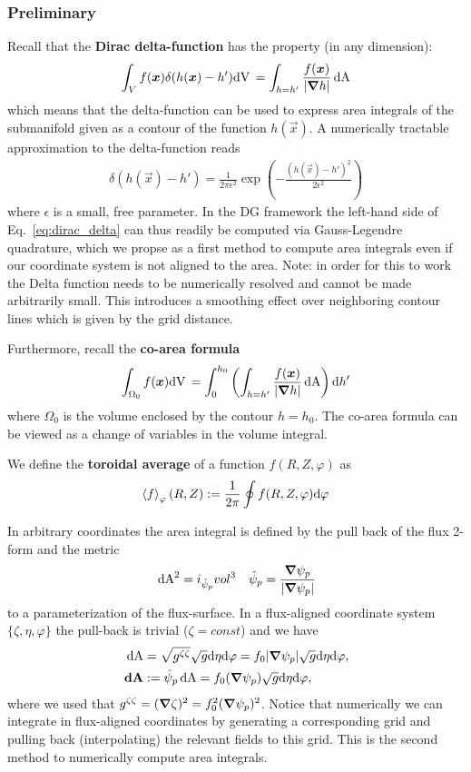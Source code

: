 \subsubsection{Preliminary}
Recall that the {\bf Dirac delta-function} has the property (in any dimension):
\begin{align} \label{eq:dirac_delta}
\int_V f({\boldsymbol{x}}) \delta(h({\boldsymbol{x}}) - h') \mathrm{dV}\, = \int_{h=h'} \frac{f({\boldsymbol{x}})}{|{\boldsymbol{\nabla}} h|} \,\mathrm{dA}
\end{align}
which means that the delta-function can be used to express area integrals of the
submanifold given as a contour of the function $h(\vec x)$.
A numerically tractable approximation to the delta-function reads
\begin{align}\label{eq:delta}
\delta(h(\vec x)-h') = \frac{1}{2\pi \epsilon^2}
\exp\left( - \frac{\left(h(\vec x)-h'\right)^2}{2\epsilon^2}\right)
\end{align}
where $\epsilon$ is a small, free parameter.
In the DG framework the left-hand side
of Eq.~\eqref{eq:dirac_delta} can thus readily be computed
via Gauss-Legendre quadrature, which we propse as a first method to compute area
integrals even if our coordinate system is not aligned to the area.
Note: in order for this to work the Delta function needs to be numerically
resolved and cannot be made arbitrarily small.
This introduces a smoothing effect
over neighboring contour lines which is given by the grid distance.

Furthermore, recall the {\bf co-area formula}
\begin{align} \label{eq:coarea}
\int_{\Omega_0} f({\boldsymbol{x}}) \mathrm{dV}\, =
\int_0^{h_0} \left( \int_{h=h'} \frac{f({\boldsymbol{x}})}{|{\boldsymbol{\nabla}} h|}  \,\mathrm{dA}  \right) \mathrm{d} h'
\end{align}
where $\Omega_0$ is the volume enclosed by the contour $h=h_0$.
The co-area formula can be viewed as a change of variables in the
volume integral.

We define the {\bf toroidal average} of a function $f(R,Z,\varphi)$ as
\begin{align} \label{eq:phi_average}
\left \langle  f \right\rangle_\varphi(R,Z) := \frac{1}{2\pi}\oint f(R,Z,\varphi)\mathrm{d} \varphi
\end{align}

In arbitrary coordinates the area integral is defined by the pull back
of the flux 2-form and the metric
\begin{align}
\label{}
\,\mathrm{dA}^2 = i_{\hat \psi_p} vol^3 \quad \hat \psi_p = \frac{{\boldsymbol{\nabla}} \psi_p}{|{\boldsymbol{\nabla}} \psi_p|}
\end{align}
to a parameterization of the flux-surface.
In a flux-aligned coordinate system $\{\zeta, \eta, \varphi\}$ the pull-back is trivial ($\zeta=const$) and we have
\begin{align}
\,\mathrm{dA} &= \sqrt{g^{\zeta\zeta}} \sqrt{g} \mathrm{d}\eta\mathrm{d}\varphi = f_0|{\boldsymbol{\nabla}}\psi_p|\sqrt{g}\mathrm{d}\eta\mathrm{d}\varphi,
\\
{\boldsymbol{\,\mathrm{dA}}} &:= \hat\psi_p \,\mathrm{dA} = f_0 ({\boldsymbol{\nabla}}\psi_p) \sqrt{g}\mathrm{d}\eta\mathrm{d}\varphi,\quad
\label{}
\end{align}
where we used that $g^{\zeta\zeta} = ({\boldsymbol{\nabla}}\zeta)^2 = f_0^2({\boldsymbol{\nabla}}\psi_p)^2$.
Notice that numerically we can integrate in flux-aligned coordinates by generating a corresponding
grid and pulling back (interpolating) the relevant fields to this grid. This is the second method
to numerically compute area integrals.

